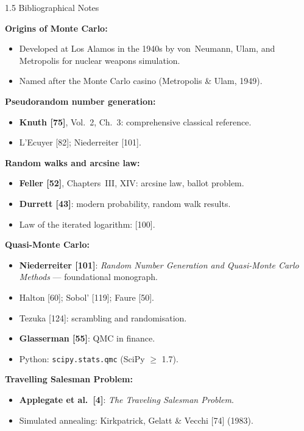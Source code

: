 \documentclass[aspectratio=169,10pt]{beamer}
\begin{document}
\begin{frame}[allowframebreaks]{1.5 Bibliographical Notes}

  \textbf{Origins of Monte Carlo:}
  \begin{itemize}
    \item Developed at Los Alamos in the 1940s by von~Neumann, Ulam,
      and Metropolis for nuclear weapons simulation.
    \item Named after the Monte Carlo casino (Metropolis \& Ulam, 1949).
  \end{itemize}

  \textbf{Pseudorandom number generation:}
  \begin{itemize}
    \item \textbf{Knuth [75]}, Vol.~2, Ch.~3: comprehensive classical reference.
    \item L'Ecuyer [82]; Niederreiter [101].
  \end{itemize}

  \textbf{Random walks and arcsine law:}
  \begin{itemize}
    \item \textbf{Feller [52]}, Chapters~III, XIV: arcsine law, ballot problem.
    \item \textbf{Durrett [43]}: modern probability, random walk results.
    \item Law of the iterated logarithm: [100].
  \end{itemize}

  \textbf{Quasi-Monte Carlo:}
  \begin{itemize}
    \item \textbf{Niederreiter [101]}: \textit{Random Number Generation and
      Quasi-Monte Carlo Methods} --- foundational monograph.
    \item Halton [60]; Sobol' [119]; Faure [50].
    \item Tezuka [124]: scrambling and randomisation.
    \item \textbf{Glasserman [55]}: QMC in finance.
    \item Python: \texttt{scipy.stats.qmc} (SciPy $\ge$ 1.7).
  \end{itemize}

  \textbf{Travelling Salesman Problem:}
  \begin{itemize}
    \item \textbf{Applegate et al.\ [4]}: \textit{The Traveling Salesman Problem}.
    \item Simulated annealing: Kirkpatrick, Gelatt \& Vecchi [74] (1983).
  \end{itemize}

\end{frame}
\end{document}
